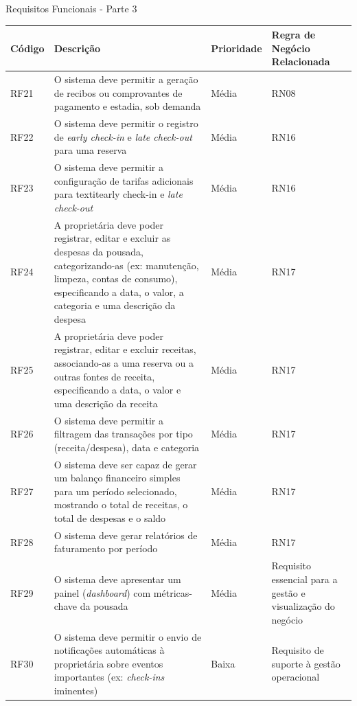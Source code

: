 \documentclass[
	12pt,				%
	openany,			%
	oneside,			%
	a4paper,			%
	english,			%
	french,				%
	spanish,			%
	brazil				%
	]{abntex2}
\begin{document}
\begin{quadro}[H]
	\caption{Requisitos Funcionais - Parte 3}
	\label{quadro_rf3}
	\begin{tabular}{|>{\centering\arraybackslash}p{1.5cm}|p{6.7cm}|>{\centering\arraybackslash}p{2cm}|>{\centering\arraybackslash}p{4cm}|}
		\hline
		\textbf{Código} & \textbf{Descrição} & \textbf{Prioridade} & \textbf{Regra de Negócio Relacionada} \\ \hline
		RF21 & O sistema deve permitir a geração de recibos ou comprovantes de pagamento e estadia, sob demanda & Média & RN08 \\ \hline
		RF22 & O sistema deve permitir o registro de \textit{early check-in} e \textit{late check-out} para uma reserva & Média & RN16 \\ \hline
		RF23 & O sistema deve permitir a configuração de tarifas adicionais para textit{early check-in} e \textit{late check-out} & Média & RN16 \\ \hline
		RF24 & A proprietária deve poder registrar, editar e excluir as despesas da pousada, categorizando-as (ex: manutenção, limpeza, contas de consumo), especificando a data, o valor, a categoria e uma descrição da despesa & Média & RN17 
		\\ \hline
		RF25 & A proprietária deve poder registrar, editar e excluir receitas, associando-as a uma reserva ou a outras fontes de receita, especificando a data, o valor e uma descrição da receita & Média & RN17 \\ \hline
		RF26 & O sistema deve permitir a filtragem das transações por tipo (receita/despesa), data e categoria & Média & RN17 \\ \hline
		RF27 & O sistema deve ser capaz de gerar um balanço financeiro simples para um período selecionado, mostrando o total de receitas, o total de despesas e o saldo & Média & RN17 \\ \hline
		RF28 & O sistema deve gerar relatórios de faturamento por período & Média & RN17 \\ \hline
		RF29 & O sistema deve apresentar um painel (\textit{dashboard}) com métricas-chave da pousada & Média & Requisito essencial para a gestão e visualização do negócio \\ \hline
		RF30 & O sistema deve permitir o envio de notificações automáticas à proprietária sobre eventos importantes (ex: \textit{check-ins} iminentes)
		& Baixa & Requisito de suporte à gestão operacional \\ \hline
	\end{tabular}
\end{quadro}
%
\end{document}
